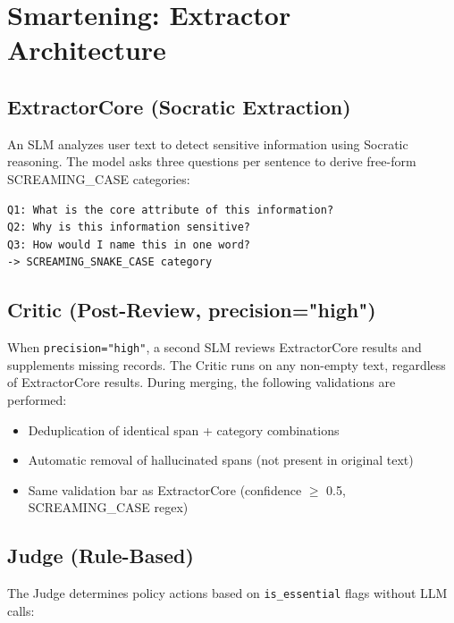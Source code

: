 \documentclass[11pt,a4paper]{article}
\begin{document}
\section{Smartening: Extractor Architecture}

\subsection{ExtractorCore (Socratic Extraction)}

An SLM analyzes user text to detect sensitive information using Socratic reasoning. The model asks three questions per sentence to derive free-form SCREAMING\_CASE categories:

\begin{verbatim}
Q1: What is the core attribute of this information?
Q2: Why is this information sensitive?
Q3: How would I name this in one word?
-> SCREAMING_SNAKE_CASE category
\end{verbatim}

\subsection{Critic (Post-Review, precision="high")}

When \texttt{precision="high"}, a second SLM reviews ExtractorCore results and supplements missing records. The Critic runs on any non-empty text, regardless of ExtractorCore results. During merging, the following validations are performed:

\begin{itemize}[nosep]
  \item Deduplication of identical span + category combinations
  \item Automatic removal of hallucinated spans (not present in original text)
  \item Same validation bar as ExtractorCore (confidence $\geq$ 0.5, SCREAMING\_CASE regex)
\end{itemize}

\subsection{Judge (Rule-Based)}

The Judge determines policy actions based on \texttt{is\_essential} flags without LLM calls:
\end{document}
